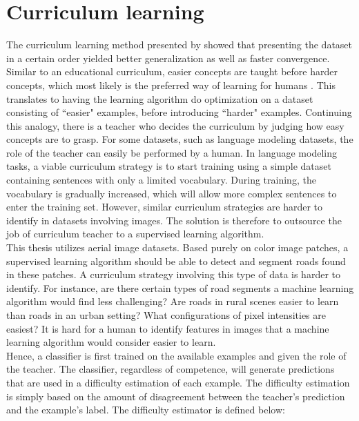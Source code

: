 \section{Curriculum learning}
\label{sec:curriculum_Learning}
The curriculum learning method presented by \cite{Bengio_curriculumlearning} showed that presenting the dataset in a certain order yielded better generalization as well as faster convergence. Similar to an educational curriculum, easier concepts are taught before harder concepts, which most likely is the preferred way of learning for humans \citep{Khan_human_teach}. This translates to having the learning algorithm do optimization on a dataset consisting of ``easier" examples, before introducing ``harder" examples. Continuing this analogy, there is a teacher who decides the curriculum by judging how easy concepts are to grasp. For some datasets, such as language modeling datasets, the role of the teacher can easily be performed by a human. In language modeling tasks, a viable curriculum strategy is to start training using a simple dataset containing sentences with only a limited vocabulary. During training, the vocabulary is gradually increased, which will allow more complex sentences to enter the training set. However, similar curriculum strategies are harder to identify in datasets involving images. The solution is therefore to outsource the job of curriculum teacher to a supervised learning algorithm.  \\

This thesis utilizes aerial image datasets. Based purely on color image patches, a supervised learning algorithm should be able to detect and segment roads found in these patches. A curriculum strategy involving this type of data is harder to identify. For instance, are there certain types of road segments a machine learning algorithm would find less challenging? Are roads in rural scenes easier to learn than roads in an urban setting? What configurations of pixel intensities are easiest? It is hard for a human to identify features in images that a machine learning algorithm would consider easier to learn. \\


Hence, a classifier is first trained on the available examples and given the role of the teacher. The classifier, regardless of competence, will generate predictions that are used in a difficulty estimation of each example. The difficulty estimation is simply based on the amount of disagreement between the teacher's prediction and the example's label. The difficulty estimator is defined below:  \\

